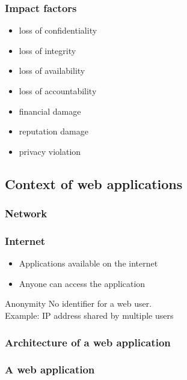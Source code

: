 \begin{frame}
\frametitle{Impact factors}
\begin{itemize}
\item loss of confidentiality
\item loss of integrity
\item loss of availability
\item loss of accountability
\item financial damage
\item reputation damage
\item privacy violation
\end{itemize}
\end{frame}

\subsection{Context of web applications}

\subsubsection{Network}

\begin{frame}
\frametitle{Internet}
\begin{itemize}
\item Applications available on the internet
\item Anyone can access the application
\end{itemize}
\begin{block}{Anonymity}
No identifier for a web user.
\\ Example: IP address shared by multiple users
\end{block}
\end{frame}

\subsubsection{Architecture of a web application}

\begin{frame}
\frametitle{A web application}
\end{frame}

